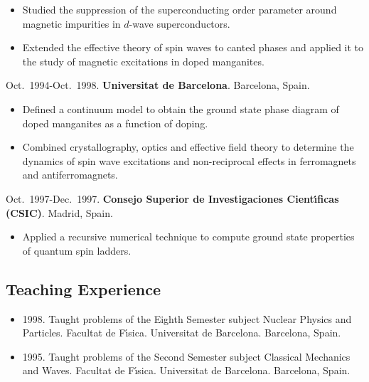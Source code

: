 \documentclass{article}
\begin{document}
\begin{itemize}\itemsep 0pt
\item Studied the suppression of the superconducting order parameter
around magnetic impurities in $d$-wave superconductors. 

\item Extended the effective theory of spin waves to canted phases
and applied it to the study of magnetic excitations in doped manganites.
\end{itemize}

Oct.~1994-Oct.~1998. {\bf Universitat de Barcelona}. Barcelona, Spain.

\begin{itemize}\itemsep 0pt
\item Defined a continuum model to obtain the ground state phase diagram 
of doped manganites as a function of doping.

\item Combined crystallography, optics and effective field theory to 
determine the dynamics of spin wave excitations and non-reciprocal 
effects in ferromagnets and antiferromagnets.
\end{itemize}

Oct.~1997-Dec.~1997. {\bf Consejo Superior de Investigaciones 
Cient\'{\i}ficas (CSIC)}. Madrid, Spain. 

\begin{itemize}\itemsep 0pt
\item Applied a recursive numerical technique to compute 
ground state properties of quantum spin ladders.
\end{itemize}



\subsection*{Teaching Experience}

\begin{itemize}\itemsep 0pt
\item 1998. 
Taught problems of the Eighth Semester subject
Nuclear Physics and Particles. 
Facultat de F\'{\i}sica. 
Universitat de Barcelona. 
Barcelona, Spain.

\item 1995. 
Taught problems of the Second Semester subject 
Classical Mechanics and Waves. 
Facultat de F\'{\i}sica. 
Universitat de Barcelona. 
Barcelona, Spain.
\end{itemize}
\end{document}
